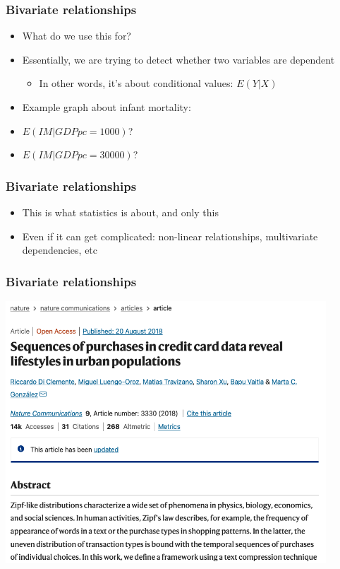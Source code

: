 \documentclass[aspectratio=43]{beamer}
\begin{document}
\begin{frame}
\frametitle{Bivariate relationships}
\centering

\begin{itemize}[<+->]
  \item<1-> What do we use this for?
  \item<2-> Essentially, we are trying to detect whether two variables are dependent
  \begin{itemize}
    \item In other words, it's about conditional values: $E(Y|X)$
  \end{itemize}
  \item<3-> Example graph about infant mortality:
  \item<3->[] $E(IM|GDPpc = 1000)$?
  \item<3->[] $E(IM|GDPpc = 30000)$?
\end{itemize}

\end{frame}

\begin{frame}
\frametitle{Bivariate relationships}
\centering

\begin{itemize}[<+->]
  \item This is what statistics is about, and only this
  \item Even if it can get complicated: non-linear relationships, multivariate dependencies, etc
\end{itemize}

\end{frame}

\begin{frame}
\frametitle{Bivariate relationships}
\centering

\includegraphics[width = 0.9\textwidth]{../img/nature_creditcard}

\end{frame}
\end{document}
